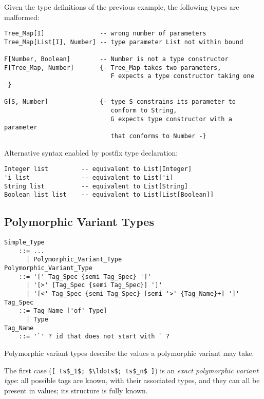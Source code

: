 \example
\label{example:parameterized-types-mal}

Given the type definitions of the previous example, the following types are malformed: 

\begin{lstlisting}
Tree_Map[I]               -- wrong number of parameters
Tree_Map[List[I], Number] -- type parameter List not within bound

F[Number, Boolean]        -- Number is not a type constructor
F[Tree_Map, Number]       {- Tree_Map takes two parameters, 
                             F expects a type constructor taking one -}

G[S, Number]              {- type S constrains its parameter to
                             conform to String, 
                             G expects type constructor with a parameter
                             that conforms to Number -}
\end{lstlisting}

\example Alternative syntax enabled by postfix type declaration:

\begin{lstlisting}
Integer list         -- equivalent to List[Integer]
'i list              -- equivalent to List['i]
String list          -- equivalent to List[String]
Boolean list list    -- equivalent to List[List[Boolean]]
\end{lstlisting}





\subsection{Polymorphic Variant Types}
\label{sec:polymorphic-variant-types}

\grammar\begin{lstlisting}[deletekeywords={not,with,or}]
Simple_Type 
    ::= ...
      | Polymorphic_Variant_Type
Polymorphic_Variant_Type 
    ::= '[' Tag_Spec {semi Tag_Spec} ']'
      | '[>' [Tag_Spec {semi Tag_Spec}] ']'
      | '[<' Tag_Spec {semi Tag_Spec} [semi '>' {Tag_Name}+] ']'
Tag_Spec 
    ::= Tag_Name ['of' Type]
      | Type
Tag_Name 
    ::= '`' ? id that does not start with ` ?
\end{lstlisting}

Polymorphic variant types describe the values a polymorphic variant may take. 

The first case (\lstinline![ ts$_1$; $\ldots$; ts$_n$ ]!) is an {\em exact polymorphic variant type}: all possible tags are known, with their associated types, and they can all be present in values; its structure is fully known. 

